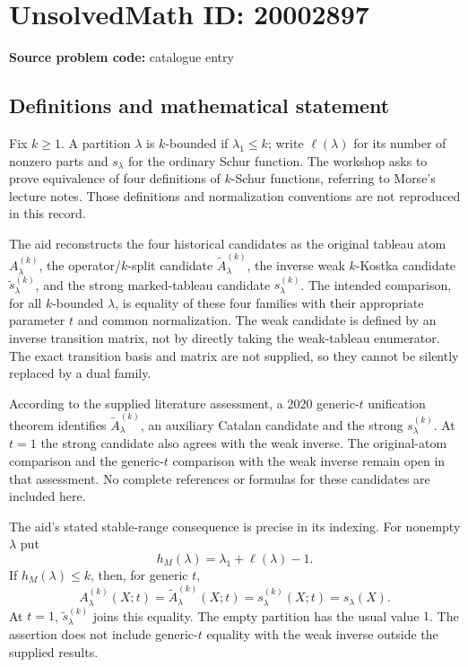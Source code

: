\documentclass[11pt]{article}
\begin{document}
\section*{UnsolvedMath ID: 20002897}
\textbf{Source problem code:} catalogue entry
\subsection{Definitions and mathematical statement}
Fix $k\geq1$. A partition $\lambda$ is $k$-bounded if $\lambda_1\leq k$; write $\ell(\lambda)$ for its number of nonzero parts and $s_\lambda$ for the ordinary Schur function. The workshop asks to prove equivalence of four definitions of $k$-Schur functions, referring to Morse's lecture notes. Those definitions and normalization conventions are not reproduced in this record.

The aid reconstructs the four historical candidates as the original tableau atom $A_\lambda^{(k)}$, the operator/$k$-split candidate $\widetilde A_\lambda^{(k)}$, the inverse weak $k$-Kostka candidate $\widetilde s_\lambda^{(k)}$, and the strong marked-tableau candidate $s_\lambda^{(k)}$. The intended comparison, for all $k$-bounded $\lambda$, is equality of these four families with their appropriate parameter $t$ and common normalization. The weak candidate is defined by an inverse transition matrix, not by directly taking the weak-tableau enumerator. The exact transition basis and matrix are not supplied, so they cannot be silently replaced by a dual family.

According to the supplied literature assessment, a 2020 generic-$t$ unification theorem identifies $\widetilde A_\lambda^{(k)}$, an auxiliary Catalan candidate and the strong $s_\lambda^{(k)}$. At $t=1$ the strong candidate also agrees with the weak inverse. The original-atom comparison and the generic-$t$ comparison with the weak inverse remain open in that assessment. No complete references or formulas for these candidates are included here.

The aid's stated stable-range consequence is precise in its indexing. For nonempty $\lambda$ put
\[
h_M(\lambda)=\lambda_1+\ell(\lambda)-1.
\]
If $h_M(\lambda)\leq k$, then, for generic $t$,
\[
A_\lambda^{(k)}(X;t)=\widetilde A_\lambda^{(k)}(X;t)
=s_\lambda^{(k)}(X;t)=s_\lambda(X).
\]
At $t=1$, $\widetilde s_\lambda^{(k)}$ joins this equality. The empty partition has the usual value $1$. The assertion does not include generic-$t$ equality with the weak inverse outside the supplied results.
\end{document}
